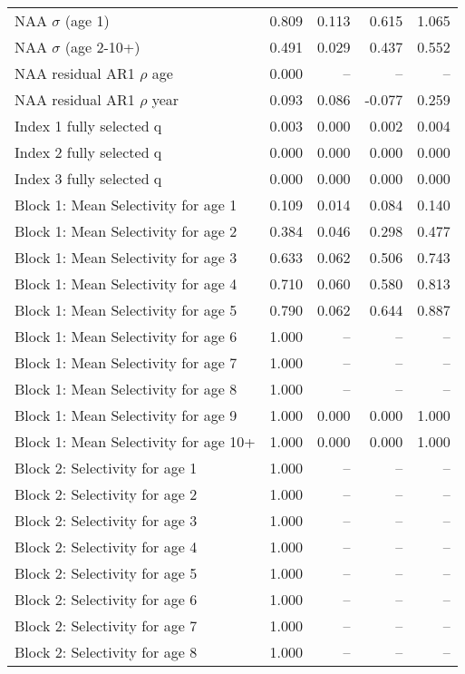 \documentclass[
]{article}
\begin{document}
\begin{landscape}
\begin{longtable}[t]{lrrrr}
\endfoot
\bottomrule
\endlastfoot
NAA $\sigma$ (age 1) & 0.809 & 0.113 & 0.615 & 1.065\\
NAA $\sigma$ (age 2-10+) & 0.491 & 0.029 & 0.437 & 0.552\\
NAA residual AR1 $\rho$ age & 0.000 & -- & -- & --\\
NAA residual AR1 $\rho$ year & 0.093 & 0.086 & -0.077 & 0.259\\
Index 1 fully selected q & 0.003 & 0.000 & 0.002 & 0.004\\
\addlinespace
Index 2 fully selected q & 0.000 & 0.000 & 0.000 & 0.000\\
Index 3 fully selected q & 0.000 & 0.000 & 0.000 & 0.000\\
Block 1: Mean Selectivity for age 1 & 0.109 & 0.014 & 0.084 & 0.140\\
Block 1: Mean Selectivity for age 2 & 0.384 & 0.046 & 0.298 & 0.477\\
Block 1: Mean Selectivity for age 3 & 0.633 & 0.062 & 0.506 & 0.743\\
\addlinespace
Block 1: Mean Selectivity for age 4 & 0.710 & 0.060 & 0.580 & 0.813\\
Block 1: Mean Selectivity for age 5 & 0.790 & 0.062 & 0.644 & 0.887\\
Block 1: Mean Selectivity for age 6 & 1.000 & -- & -- & --\\
Block 1: Mean Selectivity for age 7 & 1.000 & -- & -- & --\\
Block 1: Mean Selectivity for age 8 & 1.000 & -- & -- & --\\
\addlinespace
Block 1: Mean Selectivity for age 9 & 1.000 & 0.000 & 0.000 & 1.000\\
Block 1: Mean Selectivity for age 10+ & 1.000 & 0.000 & 0.000 & 1.000\\
Block 2: Selectivity for age 1 & 1.000 & -- & -- & --\\
Block 2: Selectivity for age 2 & 1.000 & -- & -- & --\\
Block 2: Selectivity for age 3 & 1.000 & -- & -- & --\\
\addlinespace
Block 2: Selectivity for age 4 & 1.000 & -- & -- & --\\
Block 2: Selectivity for age 5 & 1.000 & -- & -- & --\\
Block 2: Selectivity for age 6 & 1.000 & -- & -- & --\\
Block 2: Selectivity for age 7 & 1.000 & -- & -- & --\\
Block 2: Selectivity for age 8 & 1.000 & -- & -- & --\\

\end{longtable}
\end{landscape}
\end{document}
